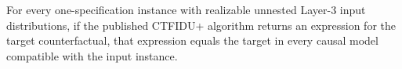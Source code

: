 For every one-specification instance with realizable unnested Layer-3 input distributions, if the published CTFIDU+ algorithm returns an expression for the target counterfactual, that expression equals the target in every causal model compatible with the input instance.